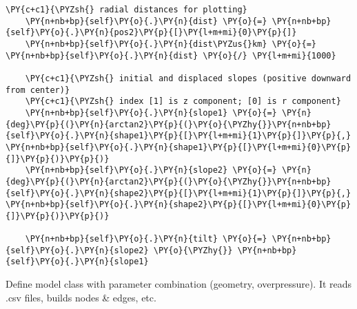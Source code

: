 \begin{tcolorbox}[breakable, size=fbox, boxrule=1pt, pad at break*=1mm,colback=cellbackground, colframe=cellborder]
\begin{Verbatim}[commandchars=\\\{\}]
    \PY{c+c1}{\PYZsh{} radial distances for plotting}
    \PY{n+nb+bp}{self}\PY{o}{.}\PY{n}{dist} \PY{o}{=} \PY{n+nb+bp}{self}\PY{o}{.}\PY{n}{pos2}\PY{p}{[}\PY{l+m+mi}{0}\PY{p}{]}
    \PY{n+nb+bp}{self}\PY{o}{.}\PY{n}{dist\PYZus{}km} \PY{o}{=} \PY{n+nb+bp}{self}\PY{o}{.}\PY{n}{dist} \PY{o}{/} \PY{l+m+mi}{1000}

    \PY{c+c1}{\PYZsh{} initial and displaced slopes (positive downward from center)}
    \PY{c+c1}{\PYZsh{} index [1] is z component; [0] is r component}
    \PY{n+nb+bp}{self}\PY{o}{.}\PY{n}{slope1} \PY{o}{=} \PY{n}{deg}\PY{p}{(}\PY{n}{arctan2}\PY{p}{(}\PY{o}{\PYZhy{}}\PY{n+nb+bp}{self}\PY{o}{.}\PY{n}{shape1}\PY{p}{[}\PY{l+m+mi}{1}\PY{p}{]}\PY{p}{,} \PY{n+nb+bp}{self}\PY{o}{.}\PY{n}{shape1}\PY{p}{[}\PY{l+m+mi}{0}\PY{p}{]}\PY{p}{)}\PY{p}{)}
    \PY{n+nb+bp}{self}\PY{o}{.}\PY{n}{slope2} \PY{o}{=} \PY{n}{deg}\PY{p}{(}\PY{n}{arctan2}\PY{p}{(}\PY{o}{\PYZhy{}}\PY{n+nb+bp}{self}\PY{o}{.}\PY{n}{shape2}\PY{p}{[}\PY{l+m+mi}{1}\PY{p}{]}\PY{p}{,} \PY{n+nb+bp}{self}\PY{o}{.}\PY{n}{shape2}\PY{p}{[}\PY{l+m+mi}{0}\PY{p}{]}\PY{p}{)}\PY{p}{)}

    \PY{n+nb+bp}{self}\PY{o}{.}\PY{n}{tilt} \PY{o}{=} \PY{n+nb+bp}{self}\PY{o}{.}\PY{n}{slope2} \PY{o}{\PYZhy{}} \PY{n+nb+bp}{self}\PY{o}{.}\PY{n}{slope1}
\end{Verbatim}
\end{tcolorbox}

Define model class with parameter combination (geometry, overpressure).
It reads .csv files, builds nodes \& edges, etc.

